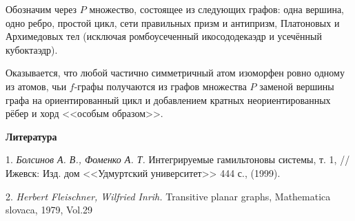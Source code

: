 	
	
	Обозначим через $P$ множество, состоящее из следующих графов: одна вершина, одно ребро, простой цикл, сети правильных призм и антипризм, Платоновых и Архимедовых тел (исключая ромбоусеченный икосододекаэдр и усечённый кубоктаэдр).
	
	
	
 Оказывается, что любой частично симметричный атом изоморфен ровно одному из атомов, чьи $f$-графы получаются из  графов множества $P$ заменой вершины графа на ориентированный цикл и  добавлением кратных неориентированных рёбер и хорд <<особым образом>>.






\smallskip \centerline {\bf Литература} \nopagebreak

1. {\it Болсинов А. В., Фоменко А. Т.} Интегрируемые гамильтоновы системы, т. 1, // Ижевск: Изд. дом <<Удмуртский университет>> 444 с., (1999).

2. {\it Herbert Fleischner, Wilfried Inrih.} Transitive planar graphs, Mathematica slovaca, 1979, Vol.29


